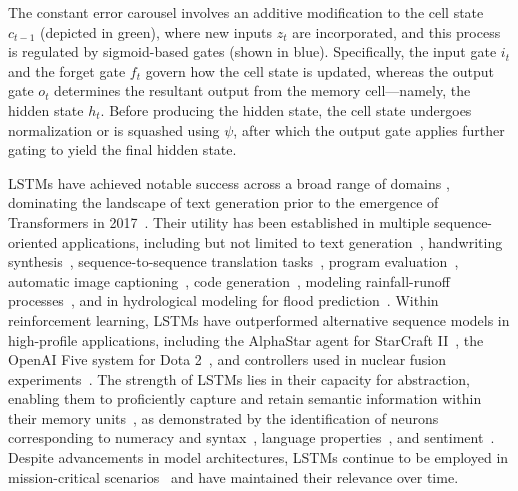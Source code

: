 The constant error carousel involves an additive modification to the cell state $c_{t-1}$ (depicted in green), where new inputs $z_t$ are incorporated, and this process is regulated by sigmoid-based gates (shown in blue). Specifically, the input gate $i_t$ and the forget gate $f_t$ govern how the cell state is updated, whereas the output gate $o_t$ determines the resultant output from the memory cell—namely, the hidden state $h_t$. Before producing the hidden state, the cell state undergoes normalization or is squashed using $\psi$, after which the output gate applies further gating to yield the final hidden state.

LSTMs have achieved notable success across a broad range of domains \citep{Hochreiter:01,Hochreiter:07,Schmidhuber:15}, dominating the landscape of text generation prior to the emergence of Transformers in 2017~\citep{Vaswani:17}. Their utility has been established in multiple sequence-oriented applications, including but not limited to text generation~\citep{Graves:13,Karpathy:15blog}, handwriting synthesis~\citep{Graves:13}, sequence-to-sequence translation tasks~\citep{Sutskever:14nips}, program evaluation~\citep{Zaremba:14arxiv}, automatic image captioning~\citep{Karpathy:15,Hossain:19}, code generation~\citep{Karpathy:15blog}, modeling rainfall-runoff processes~\citep{Kratzert:18,Kratzert:19}, and in hydrological modeling for flood prediction~\citep{Nearing:24}. Within reinforcement learning, LSTMs have outperformed alternative sequence models in high-profile applications, including the AlphaStar agent for StarCraft II~\citep{Vinyals:17short}, the OpenAI Five system for Dota 2~\citep{OpenAI:19}, and controllers used in nuclear fusion experiments~\citep{Degrave:22short}. The strength of LSTMs lies in their capacity for abstraction, enabling them to proficiently capture and retain semantic information within their memory units~\citep{Karpathy:15blog}, as demonstrated by the identification of neurons corresponding to numeracy and syntax~\citep{Lakretz:19}, language properties~\citep{Bau:19}, and sentiment~\citep{Radford:17arxiv}. Despite advancements in model architectures, LSTMs continue to be employed in mission-critical scenarios~\citep{Degrave:22short,Nearing:24} and have maintained their relevance over time.

